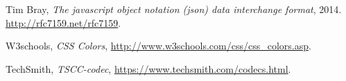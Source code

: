 \begin{thebibliography}{9}

  Tim Bray,
  \emph{The javascript object notation (json) data interchange format},
  2014. \url{http://rfc7159.net/rfc7159}.
 
 W3schools,
 \emph{CSS Colors},
 \url{http://www.w3schools.com/css/css_colors.asp}.

 TechSmith, \emph{TSCC-codec},
 \url{https://www.techsmith.com/codecs.html}.

\end{thebibliography}